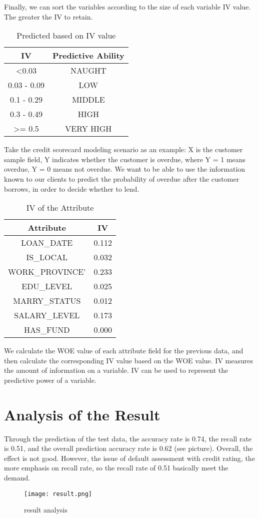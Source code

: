 \documentclass{mcmthesis}
\begin{document}
Finally, we can sort the variables according to the size of each variable IV value. The greater the IV to retain.

\begin{table}[h]
\centering
\caption{Predicted based on IV value}
\begin{tabular}{c|c}
\hline
IV & Predictive Ability\\
\hline
<0.03 & NAUGHT\\
\hline
0.03 - 0.09 & LOW\\
\hline
0.1 - 0.29 & MIDDLE\\
\hline
0.3 - 0.49 & HIGH\\
\hline
>= 0.5 & VERY HIGH\\
\hline
\end{tabular}
\label{tab1}
\end{table}

Take the credit scorecard modeling scenario as an example: X is the customer sample field, Y indicates whether the customer is overdue, where Y = 1 means overdue, Y = 0 means not overdue. We want to be able to use the information known to our clients to predict the probability of overdue after the customer borrows, in order to decide whether to lend.

\begin{table}[h]
\centering
\caption{IV of the Attribute}
\begin{tabular}{c|c}
\hline
Attribute & IV\\
\hline
LOAN\_DATE & 0.112\\
\hline
IS\_LOCAL & 0.032\\
\hline
WORK\_PROVINCE' & 0.233\\
\hline
EDU\_LEVEL & 0.025\\
\hline
MARRY\_STATUS & 0.012\\
\hline
SALARY\_LEVEL & 0.173\\
\hline
HAS\_FUND & 0.000\\
\hline
\end{tabular}
\label{tab2}
\end{table}

We calculate the WOE value of each attribute field for the previous data, and then calculate the corresponding IV value based on the WOE value. IV measures the amount of information on a variable. IV can be used to represent the predictive power of a variable.

\section{Analysis of the Result}
Through the prediction of the test data, the accuracy rate is 0.74, the recall rate is 0.51, and the overall prediction accuracy rate is 0.62 (see picture). Overall, the effect is not good. However, the issue of default assessment with credit rating, the more emphasis on recall rate, so the recall rate of 0.51 basically meet the demand.
\newpage
\begin{figure}[h]
\small
\centering
\texttt{[image: result.png]}
\caption{result analysis} \label{fig:result analysis}
\end{figure}
\end{document}
